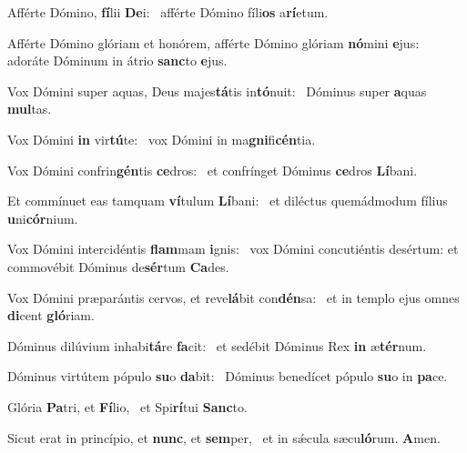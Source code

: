 \item Afférte Dómino, \textbf{fí}lii \textbf{De}i:~\psstar{} afférte Dómino fíli\textbf{os} a\textbf{rí}etum.
\item Afférte Dómino glóriam et honórem, afférte Dómino glóriam \textbf{nó}mini \textbf{e}jus:~\psstar{} adoráte Dóminum in átrio \textbf{sanc}to \textbf{e}jus.
\item Vox Dómini super aquas, Deus majes\textbf{tá}tis in\textbf{tó}nuit:~\psstar{} Dóminus super \textbf{a}quas \textbf{mul}tas.
\item Vox Dómini \textbf{in} vir\textbf{tú}te:~\psstar{} vox Dómini in ma\textbf{gni}fi\textbf{cén}tia.
\item Vox Dómini confrin\textbf{gén}tis \textbf{ce}dros:~\psstar{} et confrínget Dóminus \textbf{ce}dros \textbf{Lí}bani.
\item Et commínuet eas tamquam \textbf{ví}tulum \textbf{Lí}bani:~\psstar{} et diléctus quemádmodum fílius \textbf{u}ni\textbf{cór}nium.
\item Vox Dómini intercidéntis \textbf{flam}mam \textbf{i}gnis:~\psstar{} vox Dómini concutiéntis desértum: et commovébit Dóminus de\textbf{sér}tum \textbf{Ca}des.
\item Vox Dómini præparántis cervos, et reve\textbf{lá}bit con\textbf{dén}sa:~\psstar{} et in templo ejus omnes \textbf{di}cent \textbf{gló}riam.
\item Dóminus dilúvium inhabi\textbf{tá}re \textbf{fa}cit:~\psstar{} et sedébit Dóminus Rex \textbf{in} æ\textbf{tér}num.
\item Dóminus virtútem pópulo \textbf{su}o \textbf{da}bit:~\psstar{} Dóminus benedícet pópulo \textbf{su}o in \textbf{pa}ce.
\item Glória \textbf{Pa}tri, et \textbf{Fí}lio,~\psstar{} et Spi\textbf{rí}tui \textbf{Sanc}to.
\item Sicut erat in princípio, et \textbf{nunc}, et \textbf{sem}per,~\psstar{} et in sǽcula sæcu\textbf{ló}rum. \textbf{A}men.

